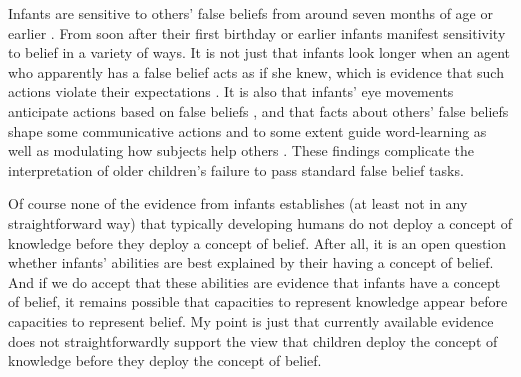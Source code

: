 \documentclass[11pt,a4paper]{extarticle}
\begin{document}
Infants are sensitive to others' false beliefs from around seven months of age or earlier \citep{kovacs_social_2010}.
From soon after their first birthday or earlier infants manifest sensitivity to belief in a variety of ways.
It is not just that infants look longer when an agent who apparently has a false belief acts as if she knew, which is evidence that such actions violate their expectations  \citep{Onishi:2005hm,Surian:2007hl}.
It is also that infants' eye movements anticipate actions based on false beliefs \citep{Southgate:2007js},
and that facts about others' false beliefs shape some communicative actions \citep{Knudsen:2011fk} and to some extent guide word-learning \citep{Carpenter:2002gc} as well as modulating how subjects help others \citep{Buttelmann:2009gy}.
These findings complicate the interpretation of older children's failure to pass standard false belief tasks.


Of course none of the evidence from infants
 establishes (at least not in any straightforward way) that typically developing humans do not deploy a concept of knowledge before they deploy a concept of belief.
After all, it is an open question whether infants' abilities are best explained by their having a concept of belief.
And if we do accept that these abilities are evidence that infants have a concept of belief, 
it remains possible that capacities to represent knowledge appear before capacities to represent belief.
My point is just that currently available evidence does not straightforwardly support the view that children deploy the concept of knowledge before they deploy the concept of belief.
\end{document}
